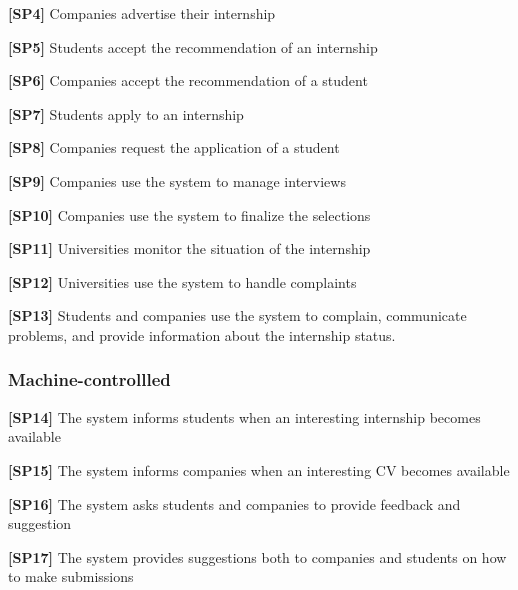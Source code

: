 \textbf{[SP4]} Companies advertise their internship

\textbf{[SP5]} Students accept the recommendation of an internship

\textbf{[SP6]} Companies accept the recommendation of a student

\textbf{[SP7]} Students apply to an internship

\textbf{[SP8]} Companies request the application of a student

\textbf{[SP9]} Companies use the system to manage interviews

\textbf{[SP10]} Companies use the system to finalize the selections

\textbf{[SP11]} Universities monitor the situation of the internship

\textbf{[SP12]} Universities use the system to handle complaints

\textbf{[SP13] }Students and companies use the system to complain, communicate problems, and provide information about the internship status.

\subsubsection{Machine-controllled}
\textbf{[SP14]} The system informs students when an interesting internship becomes available

\textbf{[SP15]} The system informs companies when an interesting CV becomes available

\textbf{[SP16]} The system asks students and companies to provide feedback and suggestion

\textbf{[SP17]} The system provides suggestions both to companies and students on how to make submissions

\pagebreak
